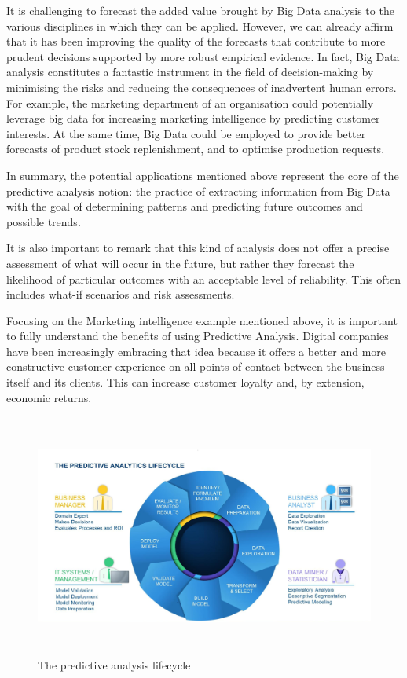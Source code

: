 It is challenging to forecast the added value brought by Big Data analysis to the various disciplines in which they can be applied. However, we can already affirm that it has been improving the quality of the forecasts that contribute to more prudent decisions supported by more robust empirical evidence. 
In fact, Big Data analysis constitutes a fantastic instrument in the field of decision-making by minimising the risks and reducing the consequences of inadvertent human errors. For example, the marketing department of an organisation could potentially leverage big data for increasing marketing intelligence by predicting customer interests. At the same time, Big Data could be employed to provide better forecasts of product stock replenishment, and to optimise production requests.

In summary, the potential applications mentioned above represent the core of the predictive analysis notion: the practice of extracting information from Big Data with the goal of determining patterns and predicting future outcomes and possible trends. 

It is also important to remark that this kind of analysis does not offer a precise assessment of what will occur in the future, but rather they forecast the likelihood of particular outcomes with an acceptable level of reliability. This often includes what-if scenarios and risk assessments.

Focusing on the Marketing intelligence example mentioned above, it is important to fully understand the benefits of using Predictive Analysis. Digital companies have been increasingly embracing that idea because it offers a better and more constructive customer experience on all points of contact between the business itself and its clients. This can increase customer loyalty and, by extension, economic returns.

\vspace{0.5cm}
\begin{figure}[htbp]
  \centering
    \includegraphics[height=8cm]{images/pa-lifecycle.jpg}
  \caption{The predictive analysis lifecycle }
  \label{fig:predictive-analysis}
\end{figure}
\vspace{0.5cm}

